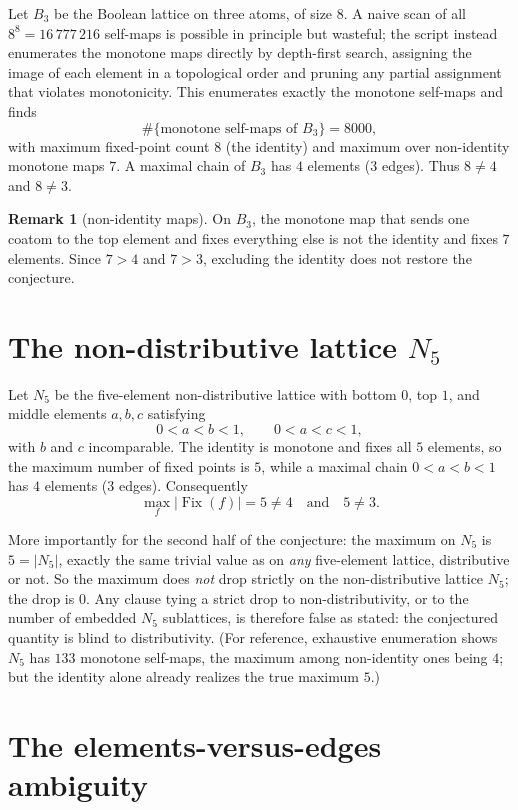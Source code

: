 \documentclass[11pt]{article}
\theoremstyle{definition}
\newtheorem{remark}[theorem]{Remark}
\newcommand{\Fix}{\operatorname{Fix}}
\begin{document}
Let $B_3$ be the Boolean lattice on three atoms, of size $8$. A naive scan of
all $8^8 = 16\,777\,216$ self-maps is possible in principle but wasteful; the
script instead enumerates the monotone maps directly by depth-first search,
assigning the image of each element in a topological order and pruning any
partial assignment that violates monotonicity. This enumerates exactly the
monotone self-maps and finds
\[
  \#\{\text{monotone self-maps of } B_3\} = 8000,
\]
with maximum fixed-point count $8$ (the identity) and maximum over
non-identity monotone maps $7$. A maximal chain of $B_3$ has $4$ elements
($3$ edges). Thus $8 \neq 4$ and $8 \neq 3$.

\begin{remark}[non-identity maps]
\label{rem:nonid}
On $B_3$, the monotone map that sends one coatom to the top element and fixes
everything else is not the identity and fixes $7$ elements. Since $7 > 4$ and
$7 > 3$, excluding the identity does not restore the conjecture.
\end{remark}

\section{The non-distributive lattice $N_5$}

Let $N_5$ be the five-element non-distributive lattice with bottom $0$, top
$1$, and middle elements $a, b, c$ satisfying
\[
  0 < a < b < 1, \qquad 0 < a < c < 1,
\]
with $b$ and $c$ incomparable. The identity is monotone and fixes all $5$
elements, so the maximum number of fixed points is $5$, while a maximal chain
$0 < a < b < 1$ has $4$ elements ($3$ edges). Consequently
\[
  \max_f |\Fix(f)| = 5 \neq 4 \quad\text{and}\quad 5 \neq 3 .
\]

More importantly for the second half of the conjecture: the maximum on $N_5$
is $5 = |N_5|$, exactly the same trivial value as on \emph{any} five-element
lattice, distributive or not. So the maximum does \emph{not} drop strictly on
the non-distributive lattice $N_5$; the drop is $0$. Any clause tying a strict
drop to non-distributivity, or to the number of embedded $N_5$ sublattices, is
therefore false as stated: the conjectured quantity is blind to
distributivity. (For reference, exhaustive enumeration shows $N_5$ has $133$
monotone self-maps, the maximum among non-identity ones being $4$; but the
identity alone already realizes the true maximum $5$.)

\section{The elements-versus-edges ambiguity}
\end{document}
